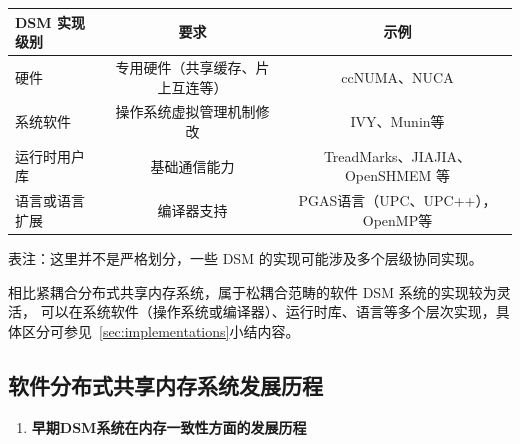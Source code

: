 {  \begin{table}[!htbp]
    \label{tab:dsm-different-implementations}
    \centering
    \footnotesize%
    \setlength{\tabcolsep}{4pt}%
    \renewcommand{\arraystretch}{1.5}%
    \begin{tabular}{lcc}
      \hline
      DSM 实现级别 & 要求               & 示例                            \\
      \hline
      硬件       & 专用硬件（共享缓存、片上互连等） & ccNUMA、NUCA                   \\
      系统软件     & 操作系统虚拟管理机制修改     & IVY、Munin等                    \\
      运行时用户库   & 基础通信能力           & TreadMarks、JIAJIA、OpenSHMEM 等 \\
      语言或语言扩展  & 编译器支持            & PGAS语言（UPC、UPC++），OpenMP等     \\
      \hline
    \end{tabular}

    \vspace*{3ex}

    \begin{minipage}{\textwidth}%
      \mdseries\par\setlength\hangindent{2\ccwd} 表注：这里并不是严格划分，一些 DSM 的实现可能涉及多个层级协同实现。
    \end{minipage}
  \end{table}

  相比紧耦合分布式共享内存系统，属于松耦合范畴的软件 DSM 系统的实现较为灵活，
  可以在系统软件（操作系统或编译器）、运行时库、语言等多个层次实现，具体区分可参见~\ref{sec:implementations}小结内容。


  \subsection{软件分布式共享内存系统发展历程}
  \begin{enumerate}[leftmargin=1em, align=left]
    \item \textbf{早期DSM系统在内存一致性方面的发展历程}


\end{enumerate}}
